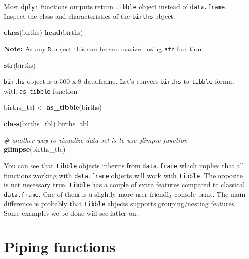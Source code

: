 \documentclass[
]{book}
\newenvironment{Shaded}{\begin{snugshade}}{\end{snugshade}}
\newcommand{\CommentTok}[1]{\textcolor[rgb]{0.56,0.35,0.01}{\textit{#1}}}
\newcommand{\FunctionTok}[1]{\textcolor[rgb]{0.13,0.29,0.53}{\textbf{#1}}}
\newcommand{\NormalTok}[1]{#1}
\newcommand{\OtherTok}[1]{\textcolor[rgb]{0.56,0.35,0.01}{#1}}
\begin{document}
Most \texttt{dplyr} functions outputs return \texttt{tibble} object instead of
\texttt{data.frame}.
Inspect the class and characteristics of the \texttt{births} object.

\begin{Shaded}
\begin{Highlighting}[]
\FunctionTok{class}\NormalTok{(births)}
\FunctionTok{head}\NormalTok{(births)}
\end{Highlighting}
\end{Shaded}

\textbf{Note:} As any \texttt{R} object this can be summarized using \texttt{str} function.

\begin{Shaded}
\begin{Highlighting}[]
\FunctionTok{str}\NormalTok{(births)}
\end{Highlighting}
\end{Shaded}

\texttt{births} object is a 500 x 8 data.frame.
Let's convert \texttt{births} to \texttt{tibble} format with \texttt{as\_tibble} function.

\begin{Shaded}
\begin{Highlighting}[]
\NormalTok{births\_tbl }\OtherTok{\textless{}{-}} \FunctionTok{as\_tibble}\NormalTok{(births)}

\FunctionTok{class}\NormalTok{(births\_tbl)}
\NormalTok{births\_tbl}

\CommentTok{\# another way to visualize data set is to use glimpse function}
\FunctionTok{glimpse}\NormalTok{(births\_tbl)}
\end{Highlighting}
\end{Shaded}

You can see that \texttt{tibble} objects inherits from \texttt{data.frame} which implies that all functions
working with \texttt{data.frame} objects will work with \texttt{tibble}. The opposite is
not necessary true. \texttt{tibble} has a couple of extra features compared to classical
\texttt{data.frame}. One of them is a slightly more user-friendly console print. The main
difference is probably that \texttt{tibble} objects supports grouping/nesting features.
Some examples we be done will see latter on.

\section{Piping functions}\label{piping-functions}
\end{document}
